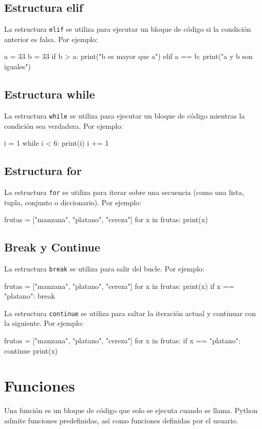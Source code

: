 \documentclass{article}
\begin{document}
\subsection{Estructura elif}
La estructura \texttt{elif} se utiliza para ejecutar un bloque de código si la condición anterior es falsa. Por ejemplo:
\begin{python_code}
a = 33
b = 33
if b > a:
  print("b es mayor que a")
elif a == b:
  print("a y b son iguales")
\end{python_code}
\subsection{Estructura while}
La estructura \texttt{while} se utiliza para ejecutar un bloque de código mientras la condición sea verdadera. Por ejemplo:
\begin{python_code}
i = 1
while i < 6:
  print(i)
  i += 1
\end{python_code}

\subsection{Estructura for}
La estructura \texttt{for} se utiliza para iterar sobre una secuencia (como una lista, tupla, conjunto o diccionario). Por ejemplo:
\begin{python_code}
frutas = ["manzana", "platano", "cereza"]
for x in frutas:
  print(x)
\end{python_code}

\subsection{Break y Continue}
La estructura \texttt{break} se utiliza para salir del bucle. Por ejemplo:
\begin{python_code}
frutas = ["manzana", "platano", "cereza"]
for x in frutas:
  print(x)
  if x == "platano":
    break
\end{python_code}
La estructura \texttt{continue} se utiliza para saltar la iteración actual y continuar con la siguiente. Por ejemplo:
\begin{python_code}
frutas = ["manzana", "platano", "cereza"]
for x in frutas:
  if x == "platano":
    continue
  print(x)
\end{python_code}

\section{Funciones}
Una función es un bloque de código que solo se ejecuta cuando se llama. Python admite funciones predefinidas, así como funciones definidas por el usuario.
\end{document}
